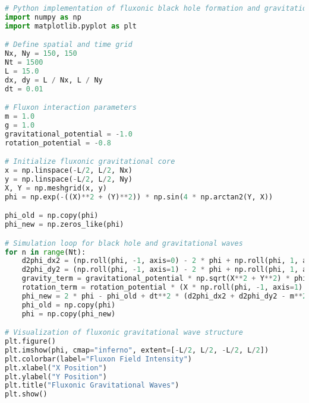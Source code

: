 \documentclass{article}
\begin{document}
\begin{lstlisting}[language=Python, caption=Fluxonic Gravitational Wave Simulation]
# Python implementation of fluxonic black hole formation and gravitational wave propagation.
import numpy as np
import matplotlib.pyplot as plt

# Define spatial and time grid
Nx, Ny = 150, 150
Nt = 1500
L = 15.0
dx, dy = L / Nx, L / Ny
dt = 0.01

# Fluxon interaction parameters
m = 1.0
g = 1.0
gravitational_potential = -1.0
rotation_potential = -0.8

# Initialize fluxonic gravitational core
x = np.linspace(-L/2, L/2, Nx)
y = np.linspace(-L/2, L/2, Ny)
X, Y = np.meshgrid(x, y)
phi = np.exp(-((X)**2 + (Y)**2)) * np.sin(4 * np.arctan2(Y, X))

phi_old = np.copy(phi)
phi_new = np.zeros_like(phi)

# Simulation loop for black hole and gravitational waves
for n in range(Nt):
    d2phi_dx2 = (np.roll(phi, -1, axis=0) - 2 * phi + np.roll(phi, 1, axis=0)) / dx**2
    d2phi_dy2 = (np.roll(phi, -1, axis=1) - 2 * phi + np.roll(phi, 1, axis=1)) / dy**2
    gravity_term = gravitational_potential * np.sqrt(X**2 + Y**2) * phi
    rotation_term = rotation_potential * (X * np.roll(phi, -1, axis=1) - Y * np.roll(phi, 1, axis=0))
    phi_new = 2 * phi - phi_old + dt**2 * (d2phi_dx2 + d2phi_dy2 - m**2 * phi - g * phi**3 + gravity_term + rotation_term)
    phi_old = np.copy(phi)
    phi = np.copy(phi_new)

# Visualization of fluxonic gravitational wave structure
plt.figure()
plt.imshow(phi, cmap="inferno", extent=[-L/2, L/2, -L/2, L/2])
plt.colorbar(label="Fluxon Field Intensity")
plt.xlabel("X Position")
plt.ylabel("Y Position")
plt.title("Fluxonic Gravitational Waves")
plt.show()
\end{lstlisting}
\end{document}
